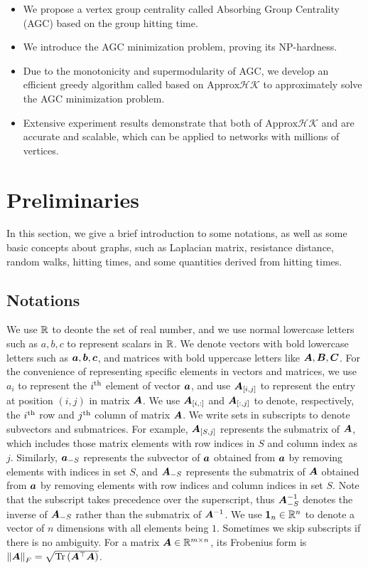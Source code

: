\documentclass[10pt,twocolumn,twoside]{IEEEtran}
\begin{document}
\begin{itemize}
    \item We propose a vertex group centrality called Absorbing Group Centrality (AGC) based on the group hitting time.
    \item We introduce the AGC minimization problem, proving its NP-hardness.
    \item Due to the monotonicity and supermodularity of AGC, we develop an efficient greedy algorithm called  based on \(\text{Approx}\mathcal{HK}\) to approximately solve the AGC minimization problem.
    \item Extensive experiment results demonstrate that both of \(\text{Approx}\mathcal{HK}\) and  are accurate and scalable, which can be applied to networks with millions of vertices.
\end{itemize}


\section{Preliminaries}

In this section, we give a brief introduction to some notations, as well as some basic concepts about graphs, such as Laplacian matrix, resistance distance, random walks, hitting times, and some quantities derived from hitting times.

\subsection{Notations}

We use  \(\mathbb{R}\) to deonte the set of real number, and we use normal lowercase letters such as \(a,b,c\) to represent scalars in \(\mathbb{R}\). We denote vectors with bold lowercase letters such as \(\boldsymbol{a},\boldsymbol{b},\boldsymbol{c}\), and matrices with bold uppercase letters like \(\boldsymbol{A},\boldsymbol{B},\boldsymbol{C}\). For the convenience of representing specific elements in vectors and matrices, we use \(a_{i}\) to represent the \({i}^{\rm{th}}\) element of vector \(\boldsymbol{a}\), and use \(\boldsymbol{A}_{[i,j]}\) to represent the entry at position \((i,j)\) in matrix \(\boldsymbol{A}\). We use \(\boldsymbol{A}_{[i,:]}\) and \(\boldsymbol{A}_{[:,j]}\) to denote, respectively, the \({i}^{\rm{th}}\) row and \({j}^{\rm{th}}\) column of matrix \(\boldsymbol{A}\). We write sets in subscripts to denote subvectors and submatrices.
For example, \(\boldsymbol{A}_{[S,j]}\) represents the submatrix of \(\boldsymbol{A}\), which includes those matrix elements with row indices in \(S\) and column index as \(j\). Similarly, \(\boldsymbol{a}_{-S}\) represents the subvector of \(\boldsymbol{a}\) obtained from  \(\boldsymbol{a}\) by removing elements with indices in set \(S\), and \(\boldsymbol{A}_{-S}\) represents the submatrix of \(\boldsymbol{A}\) obtained  from  \(\boldsymbol{a}\) by removing elements with row indices and column indices in set \(S\).
Note that the subscript takes precedence over the superscript, thus \(\boldsymbol{A}_{-S}^{-1}\) denotes the inverse of \(\boldsymbol{A}_{-S}\) rather than the submatrix of \(\boldsymbol{A}^{-1}\). We use  \(\boldsymbol{1}_n\in \mathbb{R}^n\) to denote a vector of \(n\) dimensions with all elements being \(1\). Sometimes we skip subscripts if there is no ambiguity. For a matrix \(\boldsymbol{A}\in\mathbb{R}^{m\times n}\), its Frobenius form is \(\left\Vert\boldsymbol{A}\right\Vert_F=\sqrt{\mathrm{Tr}\left(\boldsymbol{A}^\top\boldsymbol{A}\right)}\).
\end{document}
